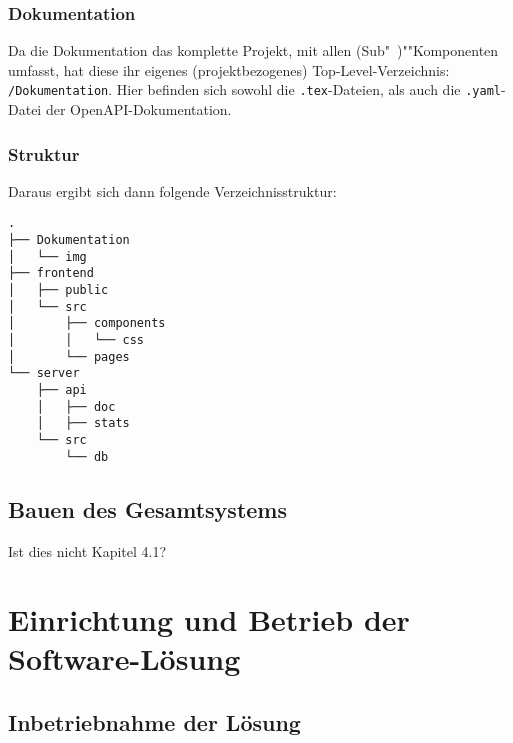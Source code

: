 \documentclass[a4paper,11pt,DIV=12,overfullrule=on]{scrreprt}%
\begin{document}
\subsection{Dokumentation}
Da die Dokumentation das komplette Projekt, mit allen (Sub"~)""Komponenten umfasst, hat diese ihr eigenes (projektbezogenes) Top-Level-Verzeichnis: \texttt{/Dokumentation}. Hier befinden sich sowohl die \texttt{.tex}-Dateien, als auch die \texttt{.yaml}-Datei der OpenAPI-Dokumentation.
\subsection{Struktur}
Daraus ergibt sich dann folgende Verzeichnisstruktur:
\begin{verbatim}
.
├── Dokumentation
│   └── img
├── frontend
│   ├── public
│   └── src
│       ├── components
│       │   └── css
│       └── pages
└── server
    ├── api
    │   ├── doc
    │   ├── stats
    └── src
        └── db

\end{verbatim}

\section{Bauen des Gesamtsystems}
Ist dies nicht Kapitel 4.1?


\chapter{Einrichtung und Betrieb der Software-Lösung}
\section{Inbetriebnahme der Lösung}
\end{document}
